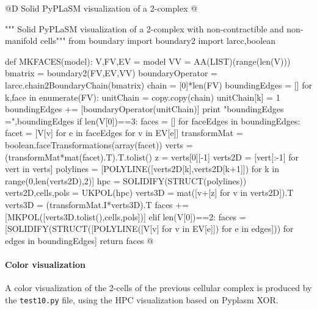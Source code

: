 \documentclass[11pt,oneside]{article}    %
\begin{document}
@D Solid PyPLaSM visualization of a 2-complex
@{""" Solid PyPLaSM visualization of a 2-complex with non-contractible 
      and non-manifold cells"""
from boundary import boundary2
import larcc,boolean

def MKFACES(model):
    V,FV,EV = model
    VV = AA(LIST)(range(len(V)))
    bmatrix = boundary2(FV,EV,VV)
    boundaryOperator = larcc.chain2BoundaryChain(bmatrix)
    chain = [0]*len(FV)
    boundingEdges = []
    for k,face in enumerate(FV):
        unitChain = copy.copy(chain)
        unitChain[k] = 1
        boundingEdges += [boundaryOperator(unitChain)]
    print "boundingEdges =",boundingEdges
    if len(V[0])==3:
        faces = []
        for faceEdges in boundingEdges:
            facet = [V[v] for e in faceEdges for v in EV[e]]
            transformMat = boolean.faceTransformations(array(facet))
            verts = (transformMat*mat(facet).T).T.tolist()
            z = verts[0][-1]
            verts2D = [vert[:-1] for vert in verts]
            polylines = [POLYLINE([verts2D[k],verts2D[k+1]]) for k in range(0,len(verts2D),2)]
            hpc = SOLIDIFY(STRUCT(polylines))
            verts2D,cells,pols = UKPOL(hpc)
            verts3D = mat([v+[z] for v in verts2D]).T
            verts3D = (transformMat.I*verts3D).T         
            faces += [MKPOL([verts3D.tolist(),cells,pols])]
    elif len(V[0])==2:
        faces = [SOLIDIFY(STRUCT([POLYLINE([V[v] for v in EV[e]]) for e in edges])) 
            for edges in boundingEdges]
    return faces
@}


\paragraph{Color visualization}
A color visualization of the 2-cells of the previous cellular complex is produced by the \texttt{test10.py} file, using the HPC visualization based on Pyplasm XOR.
\end{document}
